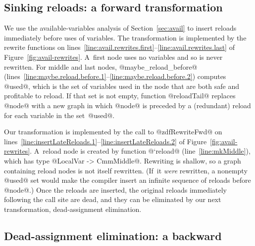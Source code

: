 \documentclass[blockstyle,preprint,natbib,nocopyrightspace]{sigplanconf}
\newcommand\lineref[1]{line~\ref{line:#1}}
\newcommand\linerangeref[2]{\mbox{lines~\ref{line:#1}--\ref{line:#2}}}
\def\finalremark#1{\relax}
\newcommand\secref[1]{Section~\ref{sec:#1}}
\newcommand\seclabel[1]{\label{sec:#1}}
\newcommand\figref[1]{Figure~\ref{fig:#1}}
\begin{document}
\subsection{Sinking reloads: a forward transformation}

\finalremark{Incidentally, I wonder if we should
use record notation when constructing @ForwardRewrites@?}

\seclabel{sink-reloads}

We use the available-variables analysis of \secref{avail} to
insert reloads
immediately before uses of variables.
The transformation is implemented by the rewrite functions on
\linerangeref{avail.rewrites.first}{avail.rewrites.last} of \figref{avail-rewrites}.
A~first node uses no variables and so is never rewritten.
For middle and last nodes, @maybe_reload_before@ 
(\linerangeref{maybe.reload.before.1}{maybe.reload.before.2})
computes @used@, which is the set
of variables used in the node that are both safe and profitable to
reload. 
%
%
If that set is not empty, function
@reloadTail@ replaces @node@ with a new graph in which @node@ is
preceded by a (redundant) reload for each variable in the set~@used@.

Our transformation is implemented by the call to @zdfRewriteFwd@
on \linerangeref{insertLateReloads.1}{insertLateReloads.2} of \figref{avail-rewrites}.
A~reload node is created by function @`reload@ (\lineref{mkMiddle}),
which has type @LocalVar -> CmmMiddle@.
Rewriting is shallow, so a graph containing reload nodes
is not itself rewritten.
(If~it \emph{were} rewritten, a nonempty @used@ set would make the
compiler insert an infinite sequence of reloads before @node@.)
Once the reloads are inserted, the original reloads immediately
following the call site are dead, and they can be eliminated by our
next transformation, dead-assignment elimination.

\subsection{Dead-assignment elimination: a backward }


\seclabel{dead-code-elimination}
\seclabel{dead-code-elim}

\seclabel{bwd-rewrite}


\def\liveout{$\mathit{live_{out}}$}
\end{document}
